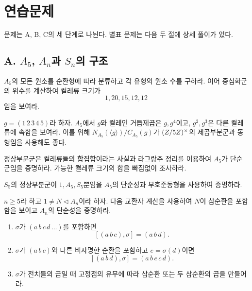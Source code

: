 \clearpage
\section{연습문제}
\label{sec:abel-ruffini-exercises}

문제는 A, B, C의 세 단계로 나뉜다. 별표 문제는 다음 두 절에 상세 풀이가 있다.

\subsection*{A. $A_5$, $A_n$과 $S_n$의 구조}

\begin{exercise}[*]
$A_5$의 모든 원소를 순환형에 따라 분류하고 각 유형의 원소 수를 구하라. 이어 중심화군의 위수를 계산하여 켤레류 크기가
\[
  1,20,15,12,12
\]
임을 보여라.
\end{exercise}

\begin{exercise}
$g=(1\,2\,3\,4\,5)$라 하자. $A_5$에서 $g$와 켤레인 거듭제곱은 $g,g^4$이고, $g^2,g^3$은 다른 켤레류에 속함을 보여라. 이를 위해 $N_{A_5}(\langle g\rangle)/C_{A_5}(g)$가 $(Z/5Z)^\times$의 제곱부분군과 동형임을 사용해도 좋다.
\end{exercise}

\begin{exercise}[*]
정상부분군은 켤레류들의 합집합이라는 사실과 라그랑주 정리를 이용하여 $A_5$가 단순군임을 증명하라. 가능한 켤레류 크기의 합을 빠짐없이 조사하라.
\end{exercise}

\begin{exercise}
$S_5$의 정상부분군이 $1,A_5,S_5$뿐임을 $A_5$의 단순성과 부호준동형을 사용하여 증명하라.
\end{exercise}

\begin{exercise}[*]
$n\ge5$라 하고 $1\ne N\triangleleft A_n$이라 하자. 다음 교환자 계산을 사용하여 $N$이 삼순환을 포함함을 보이고 $A_n$의 단순성을 증명하라.
\begin{enumerate}[label=(\alph*)]
  \item $\sigma$가 $(a\,b\,c\,d\,\dots)$를 포함하면
  \[
    [(a\,b\,c),\sigma]=(a\,b\,d).
  \]
  \item $\sigma$가 $(a\,b\,c)$와 다른 비자명한 순환을 포함하고 $e=\sigma(d)$이면
  \[
    [(a\,b\,d),\sigma]=(a\,b\,e\,c\,d).
  \]
  \item $\sigma$가 전치들의 곱일 때 고정점의 유무에 따라 삼순환 또는 두 삼순환의 곱을 만들어라.
\end{enumerate}
\end{exercise}

